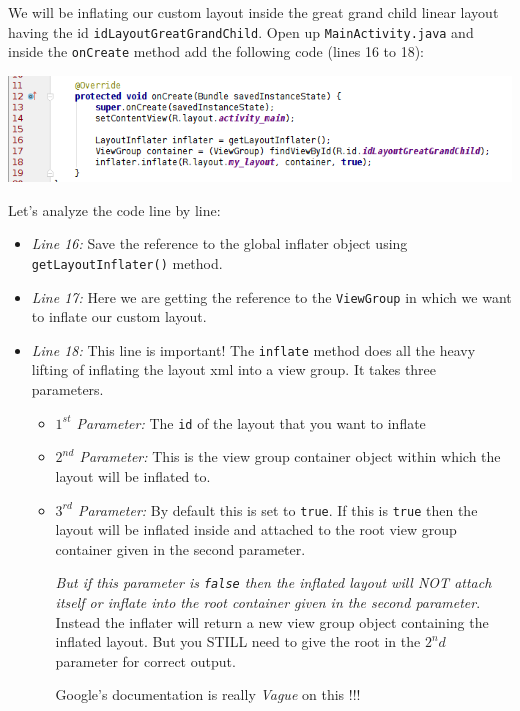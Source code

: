 We will be inflating our custom layout inside the great grand child linear layout having the id \texttt{idLayoutGreatGrandChild}. Open up \texttt{MainActivity.java} and inside the \texttt{onCreate} method add the following code (lines 16 to 18):

\begin{center}
	\includegraphics[scale=0.4]{chapters/ch06/images/34}
\end{center}

Let's analyze the code line by line:
\begin{itemize}
	\item \textit{Line 16:} Save the reference to the global inflater object using \texttt{getLayoutInflater()} method.
	
	\item \textit{Line 17:} Here we are getting the reference to the \texttt{ViewGroup} in which we want to inflate our custom layout.
	
	\item \textit{Line 18:} This line is important! The \texttt{inflate} method does all the heavy lifting of inflating the layout xml into a view group. It takes three parameters.
	\begin{itemize}
		\item \textit{$1^{st}$ Parameter: } The \texttt{id} of the layout that you want to inflate
		
		\item \textit{$2^{nd}$ Parameter: } This is the view group container object within which the layout will be inflated to.
		
		\item \textit{$3^{rd}$ Parameter: } By default this is set to \texttt{true}. If this is \texttt{true} then the layout will be inflated inside and attached to the root view group container given in the second parameter. 
		
		\textit{But if this parameter is \texttt{false} then the inflated layout will NOT attach itself or inflate into the root container given in the second parameter}. Instead the inflater will return a new view group object containing the inflated layout. But you STILL need to give the root in the $2^nd$ parameter for correct output. 
		
		Google's documentation is really \textit{Vague} on this !!!
	\end{itemize}
\end{itemize}


